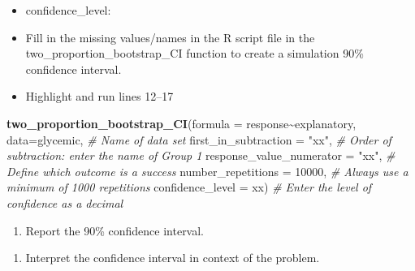 \documentclass[
]{report}
\newenvironment{Shaded}{\begin{snugshade}}{\end{snugshade}}
\newcommand{\AttributeTok}[1]{\textcolor[rgb]{0.13,0.29,0.53}{#1}}
\newcommand{\CommentTok}[1]{\textcolor[rgb]{0.56,0.35,0.01}{\textit{#1}}}
\newcommand{\DecValTok}[1]{\textcolor[rgb]{0.00,0.00,0.81}{#1}}
\newcommand{\FunctionTok}[1]{\textcolor[rgb]{0.13,0.29,0.53}{\textbf{#1}}}
\newcommand{\NormalTok}[1]{#1}
\newcommand{\SpecialCharTok}[1]{\textcolor[rgb]{0.81,0.36,0.00}{\textbf{#1}}}
\newcommand{\StringTok}[1]{\textcolor[rgb]{0.31,0.60,0.02}{#1}}
\providecommand{\tightlist}{%
  \setlength{\itemsep}{0pt}\setlength{\parskip}{0pt}}
\begin{document}
\vspace{.15in}

\begin{itemize}
\tightlist
\item
  confidence\_level:
\end{itemize}

\vspace{.15in}

\begin{itemize}
\item
  Fill in the missing values/names in the R script file in the two\_proportion\_bootstrap\_CI function to create a simulation 90\% confidence interval.
\item
  Highlight and run lines 12--17
\end{itemize}

\begin{Shaded}
\begin{Highlighting}[]
\FunctionTok{two\_proportion\_bootstrap\_CI}\NormalTok{(}\AttributeTok{formula =}\NormalTok{ response}\SpecialCharTok{\textasciitilde{}}\NormalTok{explanatory, }
         \AttributeTok{data=}\NormalTok{glycemic, }\CommentTok{\# Name of data set}
         \AttributeTok{first\_in\_subtraction =} \StringTok{"xx"}\NormalTok{, }\CommentTok{\# Order of subtraction: enter the name of Group 1}
         \AttributeTok{response\_value\_numerator =} \StringTok{"xx"}\NormalTok{, }\CommentTok{\# Define which outcome is a success }
         \AttributeTok{number\_repetitions =} \DecValTok{10000}\NormalTok{, }\CommentTok{\# Always use a minimum of 1000 repetitions}
         \AttributeTok{confidence\_level =}\NormalTok{ xx) }\CommentTok{\# Enter the level of confidence as a decimal}
\end{Highlighting}
\end{Shaded}

\begin{enumerate}
\def\labelenumi{\arabic{enumi}.}
\setcounter{enumi}{7}
\tightlist
\item
  Report the 90\% confidence interval.
\end{enumerate}

\vspace{0.3in}

\begin{enumerate}
\def\labelenumi{\arabic{enumi}.}
\setcounter{enumi}{8}
\tightlist
\item
  Interpret the confidence interval in context of the problem.
\end{enumerate}
\end{document}
